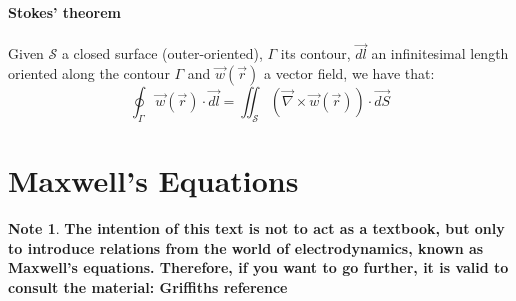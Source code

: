 \documentclass[11pt]{article}
\theoremstyle{definition}
\newtheorem{note}{Note}
\begin{document}
\begin{shaded}
    \textbf{Stokes' theorem}\\
    \\
    Given $\mathcal{S}$ a closed surface (outer-oriented), $\Gamma$ its contour, $\vec{dl}$ an infinitesimal length oriented along the contour $\Gamma$ and $\vec{w}\left(\vec{r}\right)$ a vector field, we have that:
    \begin{equation}
        \oint_{\Gamma} \vec{w}\left(\vec{r}\right) \cdot \vec{dl} = \iint_{\mathcal{S}}\left(\vec{\nabla} \times \vec{w}\left(\vec{r}\right)\right) \cdot \vec{dS}
    \end{equation}
\end{shaded}

\newpage
\section{Maxwell's Equations}
\begin{note}
    \textbf{The intention of this text is not to act as a textbook, but only to introduce relations from the world of electrodynamics,
    known as Maxwell's equations. Therefore, if you want to go further, it is valid to consult the material: Griffiths reference}
\end{note}
\end{document}
